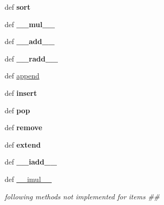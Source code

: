 \begin{CompactItemize}
\item 
\hypertarget{classPyPedal_1_1odict_1_1__items_8514d6bdbcf9dae8c8048d3484578274}{
def \textbf{sort}}
\label{classPyPedal_1_1odict_1_1__items_8514d6bdbcf9dae8c8048d3484578274}

\item 
\hypertarget{classPyPedal_1_1odict_1_1__items_121642cdec6183a0f1955427e547b963}{
def \textbf{\_\-\_\-mul\_\-\_\-}}
\label{classPyPedal_1_1odict_1_1__items_121642cdec6183a0f1955427e547b963}

\item 
\hypertarget{classPyPedal_1_1odict_1_1__items_60bb4294b2a957c7badac9b7c0664d82}{
def \textbf{\_\-\_\-add\_\-\_\-}}
\label{classPyPedal_1_1odict_1_1__items_60bb4294b2a957c7badac9b7c0664d82}

\item 
\hypertarget{classPyPedal_1_1odict_1_1__items_abf2c9ef1fc647973bd5b7a1b5311060}{
def \textbf{\_\-\_\-radd\_\-\_\-}}
\label{classPyPedal_1_1odict_1_1__items_abf2c9ef1fc647973bd5b7a1b5311060}

\item 
def \hyperlink{classPyPedal_1_1odict_1_1__items_5ba560059305625735efc628474ba326}{append}
\item 
\hypertarget{classPyPedal_1_1odict_1_1__items_261d61cb537de295a8511b2c9c49f510}{
def \textbf{insert}}
\label{classPyPedal_1_1odict_1_1__items_261d61cb537de295a8511b2c9c49f510}

\item 
\hypertarget{classPyPedal_1_1odict_1_1__items_b2490c3795b693bef787d39595ed818b}{
def \textbf{pop}}
\label{classPyPedal_1_1odict_1_1__items_b2490c3795b693bef787d39595ed818b}

\item 
\hypertarget{classPyPedal_1_1odict_1_1__items_f7b2efb8b411897cc1dd3e355ce0497e}{
def \textbf{remove}}
\label{classPyPedal_1_1odict_1_1__items_f7b2efb8b411897cc1dd3e355ce0497e}

\item 
\hypertarget{classPyPedal_1_1odict_1_1__items_137235c17d9aeb48afac02b11a6ec7fc}{
def \textbf{extend}}
\label{classPyPedal_1_1odict_1_1__items_137235c17d9aeb48afac02b11a6ec7fc}

\item 
\hypertarget{classPyPedal_1_1odict_1_1__items_b99d0a9a51d0e093c1d88f17a9f6e7f9}{
def \textbf{\_\-\_\-iadd\_\-\_\-}}
\label{classPyPedal_1_1odict_1_1__items_b99d0a9a51d0e093c1d88f17a9f6e7f9}

\item 
\hypertarget{classPyPedal_1_1odict_1_1__items_b1d24de9f21e7c0aca29faf6508b069d}{
def \hyperlink{classPyPedal_1_1odict_1_1__items_b1d24de9f21e7c0aca29faf6508b069d}{\_\-\_\-imul\_\-\_\-}}
\label{classPyPedal_1_1odict_1_1__items_b1d24de9f21e7c0aca29faf6508b069d}

\begin{CompactList}\small\item\em following methods not implemented for items \#\# \item\end{CompactList}\end{CompactItemize}


